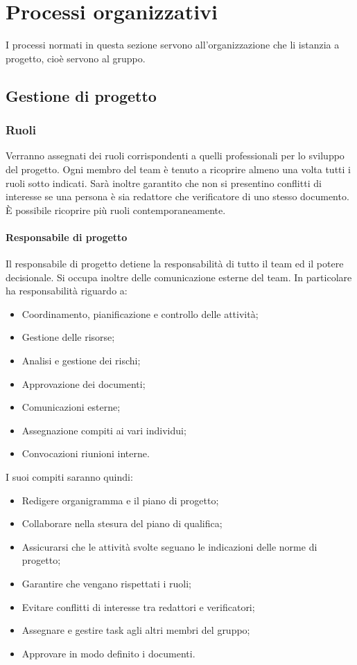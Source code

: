 
\section{Processi organizzativi} \label{sec:organizzativi}
I processi normati in questa sezione servono all'organizzazione che li istanzia a progetto, cioè servono al gruppo.

\subsection{Gestione di progetto}

\subsubsection{Ruoli} \label{sec:ruoli}
Verranno assegnati dei ruoli corrispondenti a quelli professionali per lo sviluppo del progetto. Ogni membro del team è tenuto a ricoprire almeno una volta tutti i ruoli sotto indicati. Sarà inoltre garantito che non si presentino conflitti di interesse se una persona è sia redattore che verificatore di uno stesso documento. È possibile ricoprire più ruoli contemporaneamente.
\paragraph{Responsabile di progetto}
Il responsabile di progetto detiene la responsabilità di tutto il team ed il potere decisionale. Si occupa inoltre delle comunicazione esterne del team.
In particolare ha responsabilità riguardo a:
\begin{itemize}
	\item Coordinamento, pianificazione e controllo delle attività;
	\item Gestione delle risorse;
	\item Analisi e gestione dei rischi;
	\item Approvazione dei documenti;
	\item Comunicazioni esterne;
	\item Assegnazione compiti ai vari individui;
	\item Convocazioni riunioni interne.
\end{itemize}
I suoi compiti saranno quindi:
\begin{itemize}
	\item Redigere organigramma e il piano di progetto;
	\item Collaborare nella stesura del piano di qualifica;
	\item Assicurarsi che le attività svolte seguano le indicazioni delle norme di progetto;
	\item Garantire che vengano rispettati i ruoli;
	\item Evitare conflitti di interesse tra redattori e verificatori;
	\item Assegnare e gestire task agli altri membri del gruppo;
	\item Approvare in modo definito i documenti.
\end{itemize}
